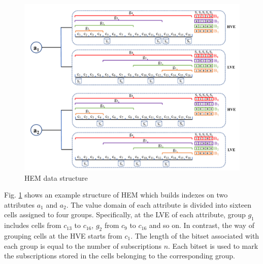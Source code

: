 \documentclass[runningheads]{llncs}
\begin{document}
\begin{figure}[tbp]
\centering
\includegraphics[scale=0.37]{figures/HEM.pdf}
\caption{HEM data structure}
\label{bds}
\end{figure}

Fig. \ref{bds} shows an example structure of HEM which builds indexes on two attributes $a_1$ and $a_2$. The value domain of each attribute is divided into sixteen cells assigned to four groups. Specifically, at the LVE of each attribute, group $g_1$ includes cells from $c_{13}$ to $c_{16}$, $g_2$ from $c_{9}$ to $c_{16}$ and so on. In contrast, the way of grouping cells at the HVE starts from $c_1$. The length of the bitset associated with each group is equal to the number of subscriptions $n$. Each bitset is used to mark the subscriptions stored in the cells belonging to the corresponding group.
\end{document}
